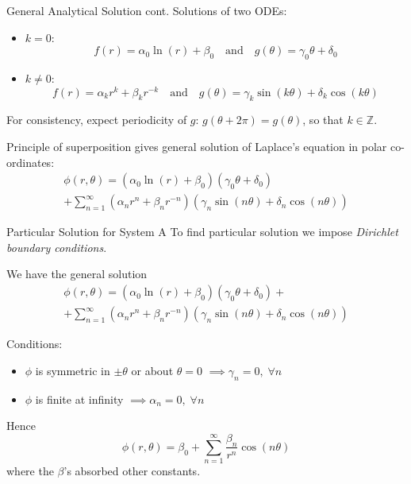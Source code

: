 \documentclass{beamer}
\newcommand{\be}{\begin{equation}}
\newcommand{\ee}{\end{equation}}
\begin{document}
\begin{frame}{General Analytical Solution cont.}
Solutions of two ODEs:
\begin{itemize}
\pause
\item $k=0$:
\pause
\be
f(r)=\alpha_0 \ln(r) + \beta_0  \quad \text{and} \quad g(\theta)=\gamma_0 \theta +\delta_0
\ee
\pause
\item $k \neq 0$:
\pause
\be
f(r)=\alpha_k r^k +\beta_k r^{-k} \quad \text{and} \quad g(\theta) = \gamma_k \sin(k\theta) +\delta_k \cos(k\theta)
\ee
\end{itemize}

\pause
For consistency, expect periodicity of $g$: $g(\theta+2\pi)=g(\theta)$, 
so that $k \in \mathbb{Z}$.

\pause
Principle of superposition gives general solution of Laplace's equation in polar
co-ordinates:
%
\begin{multline}
\phi(r, \theta) = (\alpha_0 \ln(r) + \beta_0)(\gamma_0\theta + \delta_0) \\
                + \sum_{n=1}^{\infty}(\alpha_n r^n+\beta_n r^{-n})(\gamma_n \sin(n\theta) + \delta_n \cos(n\theta))
\end{multline}

\end{frame}

\begin{frame}{Particular Solution for System A}
To find particular solution we impose \emph{Dirichlet boundary conditions}.

\pause
We have the general solution
%
\begin{multline}
\phi(r, \theta) = (\alpha_0 \ln(r) + \beta_0)(\gamma_0\theta + \delta_0) + 
\\
                + \sum_{n=1}^{\infty}(\alpha_n r^n+\beta_n r^{-n})(\gamma_n \sin(n\theta) + \delta_n \cos(n\theta))
\end{multline}

\pause

Conditions:
\begin{itemize}
\pause
\item $\phi$ is symmetric in $\pm\theta$ or about $\theta=0$ \pause $\implies \gamma_n=0, \; \forall n$
\pause
\item $\phi$ is finite at infinity \pause $\implies \alpha_n=0, \; \forall n$
\end{itemize}

\pause 
Hence
%
\be
\phi(r, \theta) = \beta_0 + \sum_{n=1}^{\infty} \frac{\beta_n}{r^n} \cos(n\theta)
\ee
%
where the $\beta$'s absorbed other constants.
\end{frame}
\end{document}
